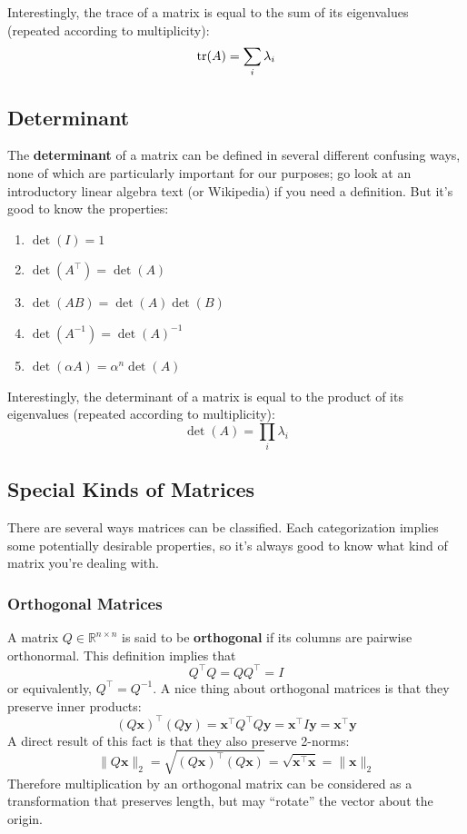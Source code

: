\documentclass{article}
\newcommand{\R}{\mathbb{R}}
\renewcommand{\vec}[1]{\mathbf{#1}}
\newcommand{\tran}{^\top}
\newcommand{\inv}{^{-1}}
\newcommand{\term}[1]{\textbf{#1}}
\begin{document}
Interestingly, the trace of a matrix is equal to the sum of its eigenvalues (repeated according to multiplicity):
\[\tr(A) = \sum_i \lambda_i\]

\subsection{Determinant}
The \term{determinant} of a matrix can be defined in several different confusing ways, none of which are particularly important for our purposes; go look at an introductory linear algebra text (or Wikipedia) if you need a definition. But it's good to know the properties:
\begin{enumerate}
\item $\det(I) = 1$
\item $\det(A\tran) = \det(A)$
\item $\det(AB) = \det(A)\det(B)$
\item $\det(A\inv) = \det(A)\inv$
\item $\det(\alpha A) = \alpha^n \det(A)$
\end{enumerate}
Interestingly, the determinant of a matrix is equal to the product of its eigenvalues (repeated according to multiplicity):
\[\det(A) = \prod_i \lambda_i\]

\subsection{Special Kinds of Matrices}
There are several ways matrices can be classified. Each categorization implies some potentially desirable properties, so it's always good to know what kind of matrix you're dealing with.

\subsubsection{Orthogonal Matrices}
A matrix $Q \in \R^{n \times n}$ is said to be \term{orthogonal} if its columns are pairwise orthonormal. This definition implies that
\[Q\tran Q = QQ\tran = I\]
or equivalently, $Q\tran = Q^{-1}$. A nice thing about orthogonal matrices is that they preserve inner products:
\[(Q\vec{x})\tran(Q\vec{y}) = \vec{x}\tran Q\tran Q\vec{y} = \vec{x}\tran I\vec{y} = \vec{x}\tran\vec{y}\]
A direct result of this fact is that they also preserve 2-norms:
\[\|Q\vec{x}\|_2 = \sqrt{(Q\vec{x})\tran(Q\vec{x})} = \sqrt{\vec{x}\tran\vec{x}} = \|\vec{x}\|_2\]
Therefore multiplication by an orthogonal matrix can be considered as a transformation that preserves length, but may ``rotate'' the vector about the origin.
\end{document}
